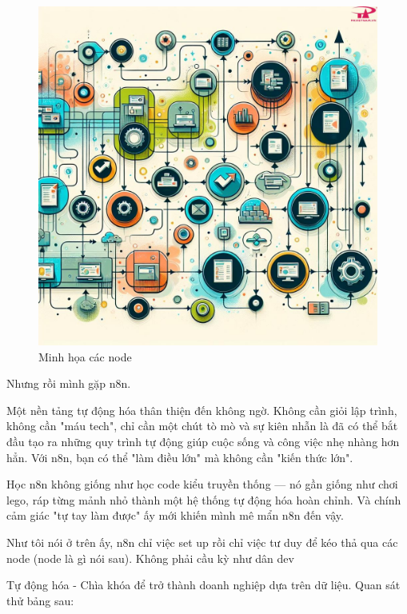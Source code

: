 \begin{figure}[htbp]
    \centering
    \includegraphics[width=1\linewidth]{images/wf.jpg}
    \caption{Minh họa các node}
\end{figure}

Nhưng rồi mình gặp n8n.

Một nền tảng tự động hóa thân thiện đến không ngờ. Không cần giỏi lập trình, không cần "máu tech", chỉ cần một chút tò mò và sự kiên nhẫn là đã có thể bắt đầu tạo ra những quy trình tự động giúp cuộc sống và công việc nhẹ nhàng hơn hẳn. Với n8n, bạn có thể "làm điều lớn" mà không cần "kiến thức lớn".

Học n8n không giống như học code kiểu truyền thống — nó gần giống như chơi lego, ráp từng mảnh nhỏ thành một hệ thống tự động hóa hoàn chỉnh. Và chính cảm giác "tự tay làm được" ấy mới khiến mình mê mẩn n8n đến vậy.

Như tôi nói ở trên ấy, n8n chỉ việc set up rồi chỉ việc tư duy để kéo thả qua các node (node là gì nói sau). Không phải cầu kỳ như dân dev 

Tự động hóa - Chìa khóa để trở thành doanh nghiệp dựa trên dữ liệu. Quan sát thử bảng sau:

